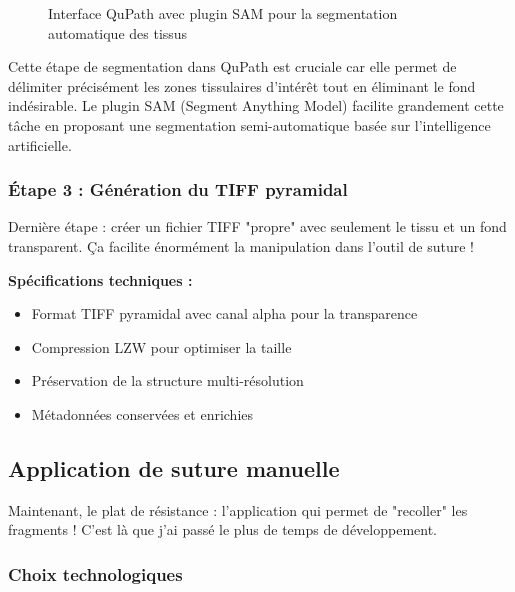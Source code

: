 \documentclass[11pt,a4paper]{report}
\begin{document}

\begin{figure}[H]
\centering
\caption{Interface QuPath avec plugin SAM pour la segmentation automatique des tissus}
\label{fig:qupath_sam}
\end{figure}

Cette étape de segmentation dans QuPath est cruciale car elle permet de délimiter précisément les zones tissulaires d'intérêt tout en éliminant le fond indésirable. Le plugin SAM (Segment Anything Model) facilite grandement cette tâche en proposant une segmentation semi-automatique basée sur l'intelligence artificielle.

\subsubsection{Étape 3 : Génération du TIFF pyramidal}

Dernière étape : créer un fichier TIFF "propre" avec seulement le tissu et un fond transparent. Ça facilite énormément la manipulation dans l'outil de suture !

\textbf{Spécifications techniques :}
\begin{itemize}
\item Format TIFF pyramidal avec canal alpha pour la transparence
\item Compression LZW pour optimiser la taille
\item Préservation de la structure multi-résolution
\item Métadonnées conservées et enrichies
\end{itemize}

\subsection{Application de suture manuelle}

Maintenant, le plat de résistance : l'application qui permet de "recoller" les fragments ! C'est là que j'ai passé le plus de temps de développement.

\subsubsection{Choix technologiques}
\end{document}
